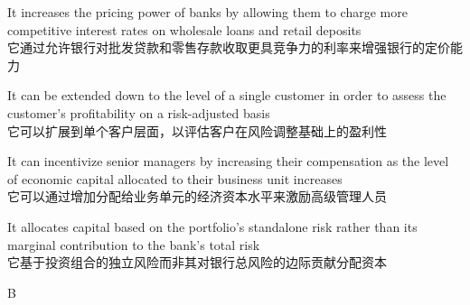 \documentclass{article}
\begin{document}
\begin{choices}
    \item It increases the pricing power of banks by allowing them to charge more competitive interest rates on wholesale loans and retail deposits\\
    它通过允许银行对批发贷款和零售存款收取更具竞争力的利率来增强银行的定价能力
    \item It can be extended down to the level of a single customer in order to assess the customer's profitability on a risk-adjusted basis\\
    它可以扩展到单个客户层面，以评估客户在风险调整基础上的盈利性
    \item It can incentivize senior managers by increasing their compensation as the level of economic capital allocated to their business unit increases\\
    它可以通过增加分配给业务单元的经济资本水平来激励高级管理人员
    \item It allocates capital based on the portfolio's standalone risk rather than its marginal contribution to the bank's total risk\\
    它基于投资组合的独立风险而非其对银行总风险的边际贡献分配资本
\end{choices}

\begin{correctanswer}
    B
\end{correctanswer}
\end{document}
